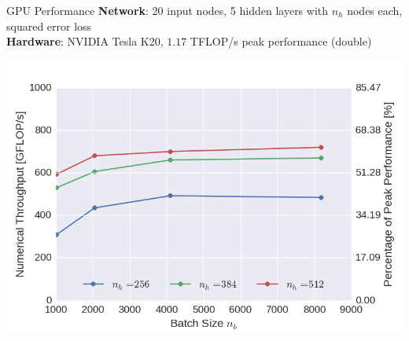 \documentclass{beamer}
\begin{document}
\begin{frame}{GPU Performance}
  \textbf{Network}: 20 input nodes, 5 hidden layers with $n_h$ nodes each,
  squared error loss \\
  \textbf{Hardware}: NVIDIA Tesla K20, $1.17$ TFLOP/s peak performance (double)

  \begin{center}
  \includegraphics[width=0.7\linewidth]{perf_gpu}
  \end{center}

\end{frame}
\end{document}
